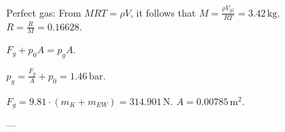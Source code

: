 Perfect gas:  
From \( MRT = \rho V \), it follows that \( M = \frac{\rho V_{g1}}{RT} = 3.42 \, \text{kg} \).  
\( R = \frac{R}{M} = 0.16628 \).  

\( F_g + p_{0}A = p_{g}A \).  

\( p_g = \frac{F_g}{A} + p_0 = 1.46 \, \text{bar} \).  

\( F_g = 9.81 \cdot (m_K + m_{EW}) = 314.901 \, \text{N} \).  
\( A = 0.00785 \, \text{m}^2 \).  

---